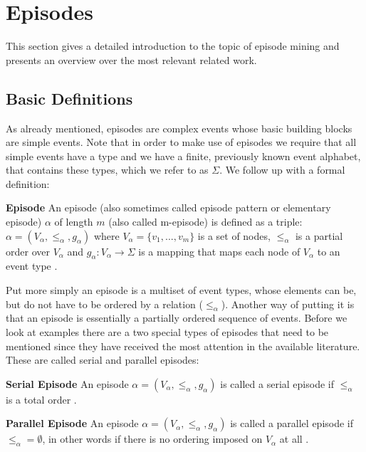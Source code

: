 \section{Episodes}
\label{sec_episodes}
This section gives a detailed introduction to the topic of episode mining and presents an overview over the most relevant related work.

\subsection{Basic Definitions}

As already mentioned, episodes are complex events whose basic building blocks are simple events. Note that  in order to make use of episodes we require that all simple events have a type and we have a finite, previously known event alphabet, that contains these types, which we refer to as $\Sigma$. We follow up with a formal definition:

\begin{mydef}
\textbf{Episode} An episode (also sometimes called episode pattern or elementary episode) $\alpha$ of length $m$ (also called m-episode) is defined as a triple: $\alpha = (V_\alpha,{\leq}_{\alpha},g_\alpha)$ where $V_\alpha = \{v_1,...,v_m\}$ is a set of nodes, ${\leq}_{\alpha}$ is a partial order over $V_\alpha$ and $g_\alpha : V_\alpha \rightarrow \Sigma$ is a mapping that maps each node of $V_\alpha$ to an event type \cite{mannila1995discovering}.
\end{mydef}

Put more simply an episode is a multiset of event types, whose elements can be, but do not have to be ordered by a relation (${\leq}_{\alpha}$). Another way of putting it is that an episode is essentially a partially ordered sequence of events. Before we look at examples there are a two special types of episodes that need to be mentioned since they have received the most attention in the available literature. These are called serial and parallel episodes:

\begin{mydef}
\textbf{Serial Episode} An episode $\alpha = (V_\alpha,{\leq}_{\alpha},g_\alpha)$ is called a serial episode if ${\leq}_{\alpha}$ is a total order \cite{mannila1995discovering}.
\end{mydef}

\begin{mydef}
\textbf{Parallel Episode} An episode $\alpha = (V_\alpha,{\leq}_{\alpha},g_\alpha)$ is called a parallel episode if ${\leq}_{\alpha} = \emptyset$, in other words if there is no ordering imposed on $V_\alpha$ at all \cite{mannila1995discovering}.
\end{mydef}

